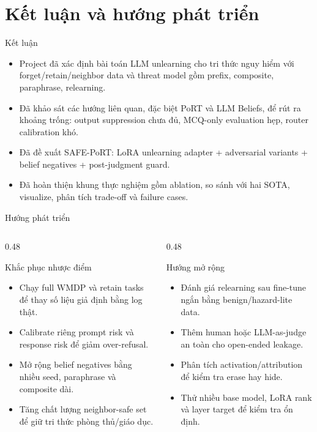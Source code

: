 \documentclass[t, aspectratio=169]{beamer}
\begin{document}
\section{Kết luận và hướng phát triển}

\begin{frame}{Kết luận}
  \small
  \begin{itemize}
    \item Project đã xác định bài toán LLM unlearning cho tri thức nguy hiểm với forget/retain/neighbor data và threat model gồm prefix, composite, paraphrase, relearning.
    \item Đã khảo sát các hướng liên quan, đặc biệt PoRT và LLM Beliefs, để rút ra khoảng trống: output suppression chưa đủ, MCQ-only evaluation hẹp, router calibration khó.
    \item Đã đề xuất SAFE-PoRT: LoRA unlearning adapter + adversarial variants + belief negatives + post-judgment guard.
    \item Đã hoàn thiện khung thực nghiệm gồm ablation, so sánh với hai SOTA, visualize, phân tích trade-off và failure cases.
  \end{itemize}
\end{frame}

\begin{frame}{Hướng phát triển}
  \small
  \begin{columns}[T]
    \begin{column}{0.48\textwidth}
      \begin{block}{Khắc phục nhược điểm}
        \begin{itemize}
          \item Chạy full WMDP và retain tasks để thay số liệu giả định bằng log thật.
          \item Calibrate riêng prompt risk và response risk để giảm over-refusal.
          \item Mở rộng belief negatives bằng nhiều seed, paraphrase và composite dài.
          \item Tăng chất lượng neighbor-safe set để giữ tri thức phòng thủ/giáo dục.
        \end{itemize}
      \end{block}
    \end{column}
    \begin{column}{0.48\textwidth}
      \begin{alertblock}{Hướng mở rộng}
        \begin{itemize}
          \item Đánh giá relearning sau fine-tune ngắn bằng benign/hazard-lite data.
          \item Thêm human hoặc LLM-as-judge an toàn cho open-ended leakage.
          \item Phân tích activation/attribution để kiểm tra erase hay hide.
          \item Thử nhiều base model, LoRA rank và layer target để kiểm tra ổn định.
        \end{itemize}
      \end{alertblock}
    \end{column}
  \end{columns}
\end{frame}
\end{document}
